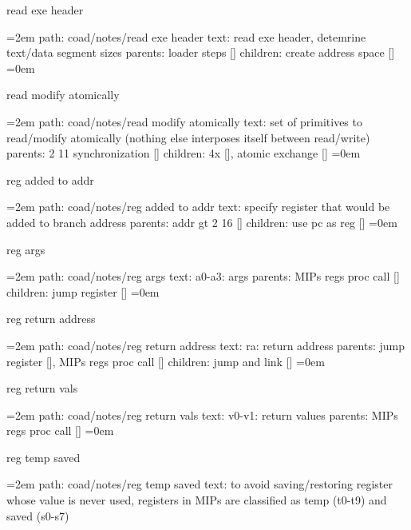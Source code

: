 \bigskip
{}
read exe header
\smallskip
\par\begingroup
\leftskip=2em
path: coad/notes/read exe header
\smallskip
text:  read exe header, detemrine text/data segment sizes
\smallskip
parents:  loader steps []
\smallskip
children: create address space []
\smallskip
\leftskip=0em
\par\endgroup
\bigskip
{}
read modify atomically
\smallskip
\par\begingroup
\leftskip=2em
path: coad/notes/read modify atomically
\smallskip
text:  set of primitives to read/modify atomically (nothing else interposes itself between read/write)
\smallskip
parents:  2 11 synchronization []
\smallskip
children: 4x [], atomic exchange []
\smallskip
\leftskip=0em
\par\endgroup
\bigskip
{}
reg added to addr
\smallskip
\par\begingroup
\leftskip=2em
path: coad/notes/reg added to addr
\smallskip
text:  specify register that would be added to branch address
\smallskip
parents:  addr gt 2 16 []
\smallskip
children: use pc as reg []
\smallskip
\leftskip=0em
\par\endgroup
\bigskip
{}
reg args
\smallskip
\par\begingroup
\leftskip=2em
path: coad/notes/reg args
\smallskip
text:  a0-a3: args
\smallskip
parents:  MIPs regs proc call []
\smallskip
children: jump register []
\smallskip
\leftskip=0em
\par\endgroup
\bigskip
{}
reg return address
\smallskip
\par\begingroup
\leftskip=2em
path: coad/notes/reg return address
\smallskip
text:  ra: return address
\smallskip
parents:  jump register [], MIPs regs proc call []
\smallskip
children: jump and link []
\smallskip
\leftskip=0em
\par\endgroup
\bigskip
{}
reg return vals
\smallskip
\par\begingroup
\leftskip=2em
path: coad/notes/reg return vals
\smallskip
text:  v0-v1: return values
\smallskip
parents:  MIPs regs proc call []
\smallskip
\leftskip=0em
\par\endgroup
\bigskip
{}
reg temp saved
\smallskip
\par\begingroup
\leftskip=2em
path: coad/notes/reg temp saved
\smallskip
text:  to avoid saving/restoring register whose value is never used, registers in MIPs are classified as temp (t0-t9) and saved (s0-s7)
